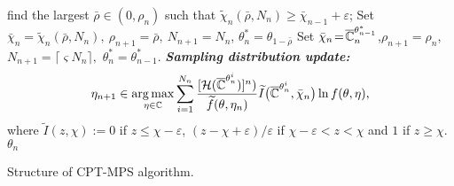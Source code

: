 \begin{algorithm}
\begin{algorithmic}
             \State find the largest $\bar \rho \in (0, \rho_n)$ such that $\widetilde\chi_{n}(\bar \rho,N_n)\geq \bar\chi_{n-1}+\varepsilon$;             
              \State Set $\bar \chi_{n}\! =\! \widetilde \chi_{n}(\bar \rho,N_n),~ \rho_{n+1}  \!=\! \bar \rho,~N_{n+1} \!=\! N_{n}$, 
              $\theta^*_{n} \!=\! \theta_{1- \bar \rho}$ \label{step:3b} 
              \Else
	      \State Set $\bar \chi_{n}  \!=\! \overline {\mathbb{C}}_n^{\theta^*_{n-1}}$,$\rho_{n+1} \!=\! \rho_n$,$N_{n+1} \!=\! \lceil\varsigma N_{n}\rceil,$ 
          $\theta^*_{n} \!=\! \theta^*_{n-1}$.\label{step:3c}
	      \EndIf
	    	  \State \textbf{\textit{Sampling distribution update:}}
		                         \begin{align*} 
\eta_{n+1} \in \mathop{\rm arg\,max}_{\eta \in \mathbb{C}}\sum_{i=1}^{N_n}\frac{[\mathcal{H}(\overline {\mathbb{C}}^{\theta^i_n})]^n)}{\widetilde f(\theta,\eta_n)}
\widetilde I\big(\overline {\mathbb{C}}^{\theta^i_n},\bar \chi_{n}\big) \ln f(\theta,\eta),
                            \end{align*}
                            where $\widetilde I(z,\chi):= 0$ if $z\leq \chi-\varepsilon$, $(z-\chi+\varepsilon)/ \varepsilon$ if $\chi-\varepsilon<z<\chi$ and $1$ if $z\geq \chi$.
\EndFor
{} $\theta_n$
\end{algorithmic}
\caption{Structure of  CPT-MPS algorithm.}
\label{alg:mras}
\end{algorithm}


